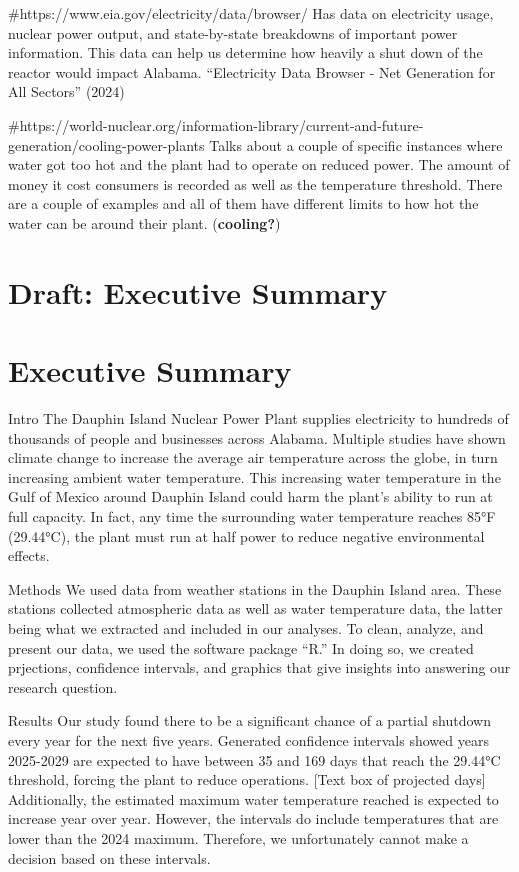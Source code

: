 \documentclass[
  letterpaper,
  DIV=11,
  numbers=noendperiod]{scrreprt}
\begin{document}
\#https://www.eia.gov/electricity/data/browser/ Has data on electricity
usage, nuclear power output, and state-by-state breakdowns of important
power information. This data can help us determine how heavily a shut
down of the reactor would impact Alabama. {``Electricity Data Browser -
Net Generation for All Sectors''} (2024)

\#https://world-nuclear.org/information-library/current-and-future-generation/cooling-power-plants
Talks about a couple of specific instances where water got too hot and
the plant had to operate on reduced power. The amount of money it cost
consumers is recorded as well as the temperature threshold. There are a
couple of examples and all of them have different limits to how hot the
water can be around their plant. (\textbf{cooling?})

\chapter{Draft: Executive Summary}\label{draft-executive-summary}

\chapter{Executive Summary}\label{executive-summary-1}

Intro The Dauphin Island Nuclear Power Plant supplies electricity to
hundreds of thousands of people and businesses across Alabama. Multiple
studies have shown climate change to increase the average air
temperature across the globe, in turn increasing ambient water
temperature. This increasing water temperature in the Gulf of Mexico
around Dauphin Island could harm the plant's ability to run at full
capacity. In fact, any time the surrounding water temperature reaches
85°F (29.44°C), the plant must run at half power to reduce negative
environmental effects.

Methods We used data from weather stations in the Dauphin Island area.
These stations collected atmospheric data as well as water temperature
data, the latter being what we extracted and included in our analyses.
To clean, analyze, and present our data, we used the software package
``R.'' In doing so, we created prjections, confidence intervals, and
graphics that give insights into answering our research question.

Results Our study found there to be a significant chance of a partial
shutdown every year for the next five years. Generated confidence
intervals showed years 2025-2029 are expected to have between 35 and 169
days that reach the 29.44°C threshold, forcing the plant to reduce
operations. {[}Text box of projected days{]} Additionally, the estimated
maximum water temperature reached is expected to increase year over
year. However, the intervals do include temperatures that are lower than
the 2024 maximum. Therefore, we unfortunately cannot make a decision
based on these intervals.
\end{document}
